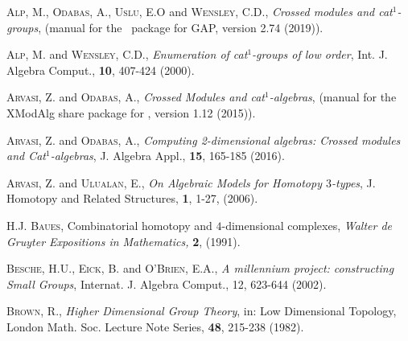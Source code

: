 \documentclass[a4paper,11pt]{article}
\theoremstyle{plain}
\theoremstyle{definition}
\begin{document}
\begin{thebibliography}{99}

	 \textsc{Alp, M.}, \textsc{Odabas, A.}, 
	               \textsc{Uslu, E.O} and \textsc{Wensley, C.D.},   
	\emph{Crossed modules and cat$^{1}$-groups}, 
	{(manual for the \XMod\ package for \textsf{GAP}, version 2.74 (2019))}. 
	
	 \textsc{Alp, M.} and \textsc{Wensley, C.D.}, 
	\emph{Enumeration of cat$^{1}$-groups of low order}, 
	Int. J. Algebra Comput., \textbf{10}, 407-424 (2000).
	
	
	 \textsc{Arvasi, Z.} and \textsc{Odabas, A.},  
	\emph{Crossed Modules and cat$^1$-algebras}, 
	{(manual for the \textsf{XModAlg} share package for \GAP, version 1.12  
	(2015)).} 
	
	 \textsc{Arvasi, Z.} and \textsc{Odabas, A.}, 
	\emph{Computing 2-dimensional algebras: Crossed modules and Cat$^1$-algebras}, 
	J. Algebra Appl., \textbf{15}, 165-185 (2016).
	
	 \textsc{Arvasi, Z.} and \textsc{Ulualan, E.}, 
	\emph{On Algebraic Models for Homotopy $3$-types}, 
	J. Homotopy and Related Structures, \textbf{1}, 1-27, (2006).
		
	
	 \textsc{H.J. Baues}, 
	\textrm{Combinatorial homotopy and $4$-dimensional complexes,} 
	\emph{Walter de Gruyter Expositions in Mathematics,} \textbf{2}, (1991).
	
	
	\textsc{Besche, H.U.}, \textsc{Eick, B.} and \textsc{O'Brien, E.A.}, 
	\emph{A millennium project: constructing Small Groups}, 
	Internat. J. Algebra Comput., 12, 623-644 (2002).
	
	 \textsc{Brown, R.}, 
	\emph{Higher Dimensional Group Theory}, 
	in: Low Dimensional Topology, 
	London Math. Soc. Lecture Note Series, \textbf{48}, 215-238 (1982).
	

\end{thebibliography}
\end{document}
